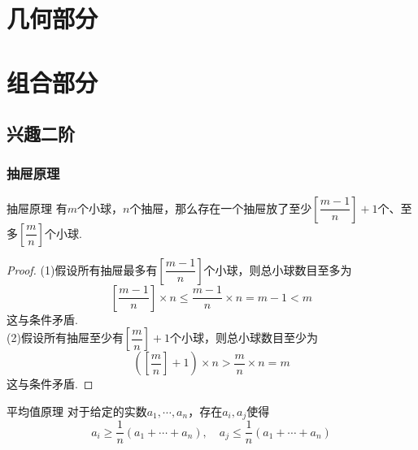 \documentclass[lang=cn, zihao=4.5]{elegantbook}
\newcommand{\ssb}[1]{\left( #1 \right)}
\begin{document}
\part{几何部分}

\part{组合部分}

\chapter{兴趣二阶}

\section{抽屉原理}

\begin{theorem}{抽屉原理}
	有$m$个小球，$n$个抽屉，那么存在一个抽屉放了至少$\left[ \dfrac{m-1}{n} \right]+1$个、至多$\left[ \dfrac{m}{n} \right]$个小球.
\end{theorem}
\begin{proof}
	(1)假设所有抽屉最多有$\left[ \dfrac{m-1}{n} \right]$个小球，则总小球数目至多为$$\left[ \frac{m-1}{n} \right] \times n \leq \frac{m-1}{n} \times n = m-1 < m$$
	这与条件矛盾. \\
	(2)假设所有抽屉至少有$\left[ \dfrac{m}{n} \right] + 1$个小球，则总小球数目至少为$$\ssb{\left[ \dfrac{m}{n} \right] + 1} \times n > \frac{m}{n} \times n = m$$
	这与条件矛盾.
\end{proof}

\begin{corollary}{平均值原理}
	对于给定的实数$a_1, \cdots ,a_n$，存在$a_i,a_j$使得$$a_i \geq \dfrac{1}{n}(a_1+ \cdots +a_n), \quad a_j \leq \dfrac{1}{n}(a_1+ \cdots +a_n)$$
\end{corollary}
\end{document}
